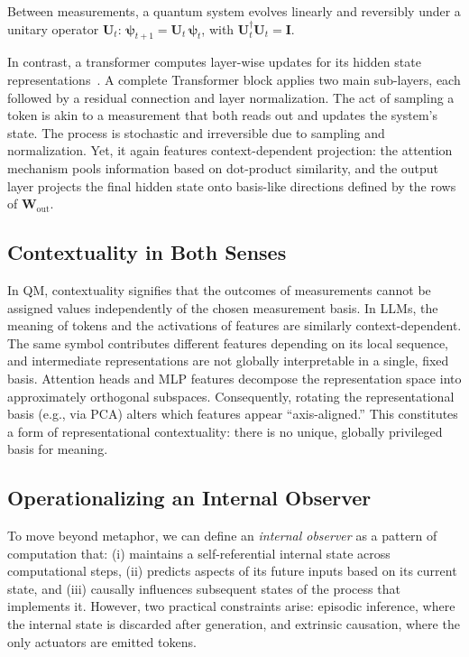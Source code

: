 \documentclass[%
  reprint,
  superscriptaddress,
  showpacs,
  showkeys,
  amsmath,amssymb,
  pra,
  longbibliography,
  floatfix,
  x11names
]{revtex4-2}
\begin{document}
Between measurements, a quantum system evolves linearly and reversibly under a unitary operator $\bm{U}_t$:
$\bm{\psi}_{t+1} = \bm{U}_t \, \bm{\psi}_t$, with $\bm{U}_t^\dagger \bm{U}_t = \bm{I}$.


In contrast, a transformer computes layer-wise updates for its hidden state representations~\cite{li-2024,zhang2025surveyquantumtransformersarchitectures}.
A complete Transformer block applies two main sub-layers,
each followed by a residual connection and layer normalization.
The act of sampling a token is akin to
a measurement that both reads out and updates the system's state.
The process is stochastic and irreversible due to sampling and normalization.
Yet, it again features context-dependent projection: the attention mechanism pools information based on dot-product similarity, and the output layer projects the final hidden state onto basis-like directions defined by the rows of $\bm{W}_{\text{out}}$.

\subsection{Contextuality in Both Senses}

In QM, contextuality signifies that the outcomes of measurements cannot be assigned values independently of the chosen measurement basis. In LLMs, the meaning of tokens and the activations of features are similarly context-dependent. The same symbol contributes different features depending on its local sequence, and intermediate representations are not globally interpretable in a single, fixed basis. Attention heads and MLP features decompose the representation space into approximately orthogonal subspaces. Consequently, rotating the representational basis (e.g., via PCA) alters which features appear ``axis-aligned.'' This constitutes a form of representational contextuality: there is no unique, globally privileged basis for meaning.

\subsection{Operationalizing an Internal Observer}

To move beyond metaphor, we can define an \emph{internal observer} as a pattern of computation that: (i) maintains a self-referential internal state across computational steps, (ii) predicts aspects of its future inputs based on its current state, and (iii) causally influences subsequent states of the process that implements it. However, two practical constraints arise: episodic inference, where the internal state is discarded after generation, and extrinsic causation, where the only actuators are emitted tokens.
\end{document}
